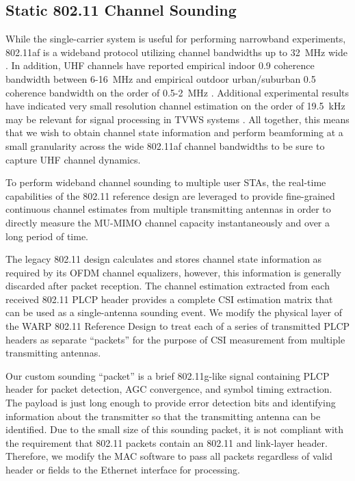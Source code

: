 \subsection{Static 802.11 Channel Sounding}
\label{sec_static_miso_chan_est}

	While the single-carrier system is useful for performing narrowband experiments, 802.11af is a wideband protocol utilizing channel bandwidths up to 32~MHz wide \cite{flores2013ieee80211af}.
	In addition, UHF channels have reported empirical indoor 0.9 coherence bandwidth between 6-16~MHz \cite{varela2001rms} and empirical outdoor urban/suburban 0.5 coherence bandwidth on the order of 0.5-2~MHz \cite{bajwa1985large}.
	Additional experimental results have indicated very small resolution channel estimation on the order of 19.5~kHz may be relevant for signal processing in \ac{TVWS} systems \cite{zhang2016watch}.
	All together, this means that we wish to obtain channel state information and perform beamforming at a small granularity across the wide 802.11af channel bandwidths to be sure to capture UHF channel dynamics.

	To perform wideband channel sounding to multiple user \acp{STA}, the real-time capabilities of the 802.11 reference design are leveraged to provide fine-grained continuous channel estimates from multiple transmitting antennas in order to directly measure the \ac{MU-MIMO} channel capacity instantaneously and over a long period of time.

	The legacy 802.11 design calculates and stores channel state information as required by its OFDM channel equalizers, however, this information is generally discarded after packet reception.
	The channel estimation extracted from each received 802.11 PLCP header \cite{std11ac} provides a complete \ac{CSI} estimation matrix that can be used as a single-antenna sounding event.
	We modify the physical layer of the WARP 802.11 Reference Design \cite{warp80211} to treat each of a series of transmitted PLCP headers as separate ``packets'' for the purpose of \ac{CSI} measurement from multiple transmitting antennas.

	Our custom sounding ``packet'' is a brief 802.11g-like signal containing PLCP header for packet detection, AGC convergence, and symbol timing extraction.
	The payload is just long enough to provide error detection bits and identifying information about the transmitter so that the transmitting antenna can be identified.
	Due to the small size of this sounding packet, it is not compliant with the requirement that 802.11 packets contain an 802.11 and link-layer header.
	Therefore, we modify the MAC software to pass all packets regardless of valid header or fields to the Ethernet interface for processing.
	
